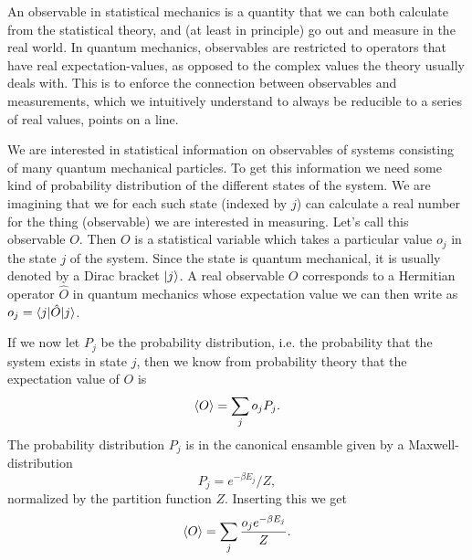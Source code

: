 An observable in statistical mechanics is a quantity that we can both calculate from the statistical theory,
and (at least in principle) go out and measure in the real world. In quantum mechanics, observables
are restricted to operators that have real expectation-values, as opposed to the complex values the theory usually
deals with. This is to enforce the connection between observables and measurements, which we intuitively understand
to always be reducible to a series of real values, \ie points on a line.

We are interested in statistical information on observables of systems consisting of many quantum mechanical particles.
To get this information we need some kind of probability distribution of the
different states of the system. We are imagining that we for each such state (indexed by $j$) can calculate
a real number for the thing (observable) we are interested in measuring. Let's call this observable $O$. Then
$O$ is a statistical variable which takes a particular value $o_j$ in the state $j$ of the system. Since the state is
quantum mechanical, it is usually denoted by a Dirac bracket $\lvert j \rangle$. A real observable $O$ corresponds to a
Hermitian operator $\hat{O}$ in quantum mechanics whose expectation value we can then write as $o_j = \langle j \rvert\hat{O}\lvert j \rangle$.

If we
now let $P_j$ be the probability distribution, i.e. the probability that the system exists in state $j$, then
we know from probability theory that the expectation value of $O$ is
\begin{equation}
    \label{eq:statMech:statMean}
    \langle O \rangle = \sum_jo_jP_j.
\end{equation}
The probability distribution $P_j$ is in the canonical ensamble given by a Maxwell-distribution
\begin{equation}
    \label{eq:statMech:probDist}
    P_j = e^{-\beta E_j}/Z,
\end{equation}
normalized by the partition function $Z$. Inserting this we get
\begin{equation}
    \label{eq:stateMech:statMeanFull}
    \langle O \rangle = \sum_j\frac{o_je^{-\beta E_j}}{Z}.
\end{equation}


